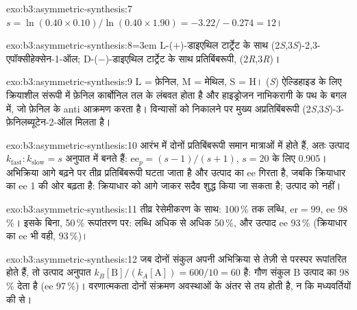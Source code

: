 \begin{solution}{exo:b3:asymmetric-synthesis:7}
$s = \ln(0.40 \times 0.10)/\ln(0.40 \times 1.90) = -3.22/-0.274 = 12$।
\end{solution}

\begin{solution}{exo:b3:asymmetric-synthesis:8}\emergencystretch=3em
L-($+$)-डाइएथिल टार्ट्रेट के साथ (2\textit{S},3\textit{S})-2,3-एपॉक्सीहेक्सेन-1-ऑल; D-($-$)-डाइएथिल टार्ट्रेट के साथ
प्रतिबिंबरूपी, (2\textit{R},3\textit{R})।
\end{solution}

\begin{solution}{exo:b3:asymmetric-synthesis:9}
L = फ़ेनिल, M = मेथिल, S = H। (\textit{S}) ऐल्डिहाइड के लिए क्रियाशील संरूपी में फ़ेनिल
कार्बोनिल तल के लंबवत होता है और हाइड्रोजन नाभिकरागी के पथ के बगल में,
जो फ़ेनिल के anti आक्रमण करता है। विन्यासों को निकालने पर मुख्य अप्रतिबिंबरूपी
(2\textit{S},3\textit{S})-3-फ़ेनिलब्यूटेन-2-ऑल मिलता है।
\end{solution}

\begin{solution}{exo:b3:asymmetric-synthesis:10}
आरंभ में दोनों प्रतिबिंबरूपी समान मात्राओं में होते हैं, अतः उत्पाद
$k_{\mathrm{fast}} : k_{\mathrm{slow}} = s$ अनुपात में बनते हैं: $\mathrm{ee}_p = (s - 1)/(s + 1)$, $s = 20$ के लिए 0.905। अभिक्रिया आगे बढ़ने पर
तीव्र प्रतिबिंबरूपी घटता जाता है और उत्पाद का ee गिरता है, जबकि क्रियाधार का ee 1 की ओर
बढ़ता है: क्रियाधार को आगे जाकर सदैव शुद्ध किया जा सकता है; उत्पाद को
नहीं।
\end{solution}

\begin{solution}{exo:b3:asymmetric-synthesis:11}
तीव्र रेसेमीकरण के साथ: 100\,\% तक लब्धि, $\mathrm{er} = 99$, ee 98\,\%। इसके बिना, 50\,\%
रूपांतरण पर: लब्धि अधिक से अधिक 50\,\%, और उत्पाद ee 93\,\% (क्रियाधार का ee भी
वही, 93\,\%)।
\end{solution}

\begin{solution}{exo:b3:asymmetric-synthesis:12}
जब दोनों संकुल अपनी अभिक्रिया से तेज़ी से परस्पर रूपांतरित होते हैं, तो उत्पाद अनुपात
$k_B[\mathrm B]/(k_A[\mathrm A]) = 600/10 = 60$ है: गौण संकुल B उत्पाद का 98\,\% देता है (ee 97\,\%)।
वरणात्मकता दोनों संक्रमण अवस्थाओं के अंतर से तय होती है, न कि
मध्यवर्तियों की  से।
\end{solution}

